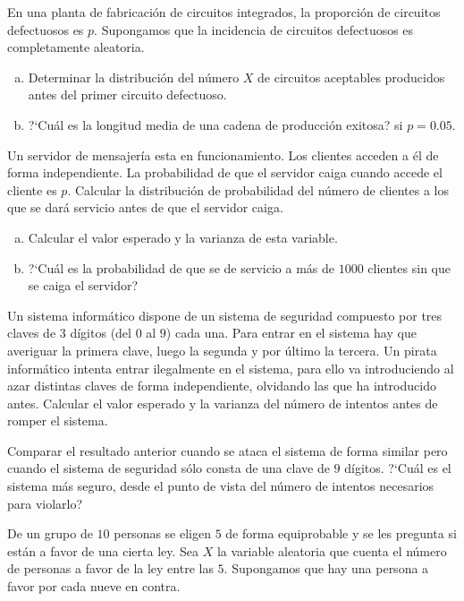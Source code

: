 \documentclass[12pt]{article}
\begin{document}
\probl  En una planta de fabricación de circuitos integrados, la proporción de circuitos
defectuosos es $p$. Supongamos que la incidencia de circuitos defectuosos es completamente
aleatoria.
\begin{enumerate}[a)]
\item  Determinar la distribución del número $X$ de circuitos
aceptables producidos antes del primer circuito defectuoso.
\item  ?`Cuál es la longitud media de una cadena de producción exitosa? si
$p = 0.05.$
\end{enumerate}

\probl Un servidor de mensajería esta en funcionamiento. Los clientes acceden a él de forma
independiente. La probabilidad de que el servidor caiga cuando accede el cliente es $p$.
Calcular la distribución de probabilidad del número de clientes a los que se dará servicio
antes de que el servidor caiga.

\begin{enumerate}[a)]
\item Calcular el valor esperado y la varianza de esta variable.
\item  ?`Cuál es la probabilidad de que se de servicio a más de $1000$ clientes sin que se
caiga el servidor?
\end{enumerate}

\probl Un sistema informático  dispone de un sistema de seguridad compuesto por tres claves
de $3$ dígitos (del $0$ al $9$) cada una. Para entrar en el sistema hay que averiguar la
primera clave, luego la segunda y por último la tercera. Un pirata informático intenta
entrar ilegalmente en el sistema, para ello va introduciendo al azar distintas claves de
forma independiente, olvidando las que ha introducido antes. Calcular el valor esperado y
la varianza del número de intentos antes de romper el sistema.

Comparar el resultado anterior cuando se ataca el sistema de forma similar pero cuando el
sistema de seguridad sólo consta de una clave de $9$ dígitos. ?`Cuál es el sistema más
seguro, desde el punto de vista del número de intentos necesarios para violarlo?




\probl De un grupo de $10$ personas se eligen $5$ de forma equiprobable y se les pregunta
si están a favor de una cierta ley. Sea $X$ la variable aleatoria que cuenta el número de
personas a favor de la ley entre las $5$. Supongamos que hay una persona a favor por cada
nueve en contra.
\end{document}

